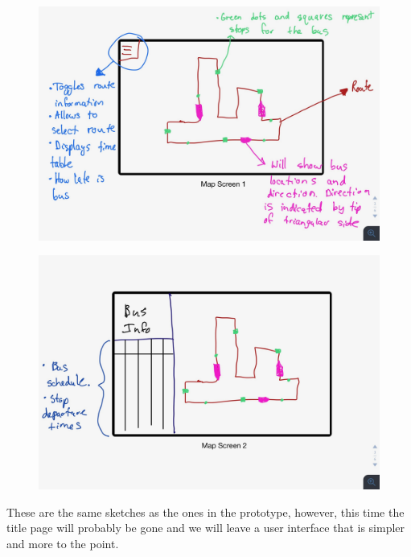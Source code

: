 \documentclass[12pt]{report}
\begin{document}
	\begin{figure}[h]
		\includegraphics[scale=0.15]{MapScreen1}
		\centering
	\end{figure}
	\newpage
	
	
	\begin{figure}[h]
		\includegraphics[scale=0.15]{MapScreen2}
		\centering
	\end{figure}
	
	These are the same sketches as the ones in the prototype, however, this time the title page will probably be gone and we will leave a user interface that is simpler and more to the point.\\
\end{document}
